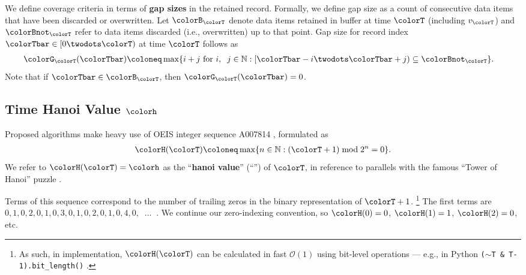 We define coverage criteria in terms of \textbf{gap sizes} in the retained record.
Formally, we define gap size as a count of consecutive data items that have been discarded or overwritten.
Let $\colorB_{\colorT}$ denote data items retained in buffer at time $\colorT$ (including $v_{\colorT}$) and $\colorBnot_{\colorT}$ refer to data items discarded (i.e., overwritten) up to that point.
Gap size for record index $\colorTbar \in [0 \twodots \colorT)$ at time $\colorT$ follows as
\begin{align}
\colorG_{\colorT}(\colorTbar)
&\coloneq
\max
\{
  i + j
  \text{ for }
  i,\;\; j \in \mathbb{N}
  :
  [\colorTbar-i \twodots \colorTbar+j) \subseteq \colorBnot_{\colorT}
\}.
\label{eqn:gap-size-defn}
\end{align}
Note that if $\colorTbar \in \colorB_{\colorT}$, then $\colorG_{\colorT}(\colorTbar) = 0$.

\subsection{Time Hanoi Value $\colorh$}
\label{sec:notation-hanoi}

Proposed algorithms make heavy use of OEIS integer sequence A007814 \citep{oeis}, formulated as
\begin{align}
\colorH(\colorT)
\coloneq
\max \{ n \in \mathbb{N} : (\colorT + 1) \bmod 2^n = 0 \}.
\label{eqn:hanoi-defn}
\end{align}
We refer to $\colorH(\colorT) = \colorh$ as the ``\textbf{hanoi value}'' (``\textbf{\hv{}}'') of $\colorT$, in reference to parallels with the famous ``Tower of Hanoi'' puzzle \citep{lucas1889jeux}.

Terms of this sequence correspond to the number of trailing zeros in the binary representation of $\colorT + 1$.%
\footnote{%
As such, in implementation, $\colorH(\colorT)$ can be calculated in fast $\mathcal{O}(1)$ using bit-level operations --- e.g., in Python \texttt{($\sim$T \& T-1).bit\_length()} \citep{oeis}.
}
The first terms are $0,\allowbreak 1,\allowbreak 0,\allowbreak 2,\allowbreak 0,\allowbreak 1,\allowbreak 0,\allowbreak 3,\allowbreak 0,\allowbreak 1,\allowbreak 0,\allowbreak 2,\allowbreak 0,\allowbreak 1,\allowbreak 0,\allowbreak 4,\allowbreak 0,\allowbreak \;\;\ldots \;\;$.
We continue our zero-indexing convention, so $\colorH(0) = 0$, $\colorH(1) = 1$, $\colorH(2) = 0$, etc.

